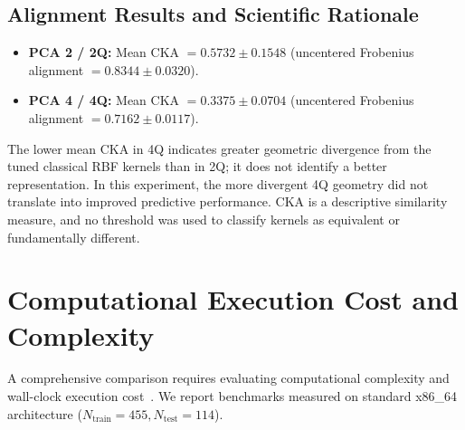 \documentclass[12pt,a4paper]{article}
\begin{document}
\begin{table}[htbp]
\centering
\caption{Kernel Geometry and Centered Kernel Alignment (CKA) across 5 Outer Splits (Mean $\pm$ SD).}
\label{tab:cka}
\vspace{2mm}
\end{table}

\subsection{Alignment Results and Scientific Rationale}
\begin{itemize}
    \item \textbf{PCA 2 / 2Q:} Mean CKA $= \mathbf{0.5732 \pm 0.1548}$ (uncentered Frobenius alignment $= 0.8344 \pm 0.0320$).
    \item \textbf{PCA 4 / 4Q:} Mean CKA $= \mathbf{0.3375 \pm 0.0704}$ (uncentered Frobenius alignment $= 0.7162 \pm 0.0117$).
\end{itemize}
The lower mean CKA in 4Q indicates greater geometric divergence from the tuned classical RBF kernels than in 2Q; it does not identify a better representation. In this experiment, the more divergent 4Q geometry did not translate into improved predictive performance. CKA is a descriptive similarity measure, and no threshold was used to classify kernels as equivalent or fundamentally different.

\section{Computational Execution Cost and Complexity}
A comprehensive comparison requires evaluating computational complexity and wall-clock execution cost~\cite{chang2011libsvm, preskill2018quantum}. We report benchmarks measured on standard x86\_64 architecture ($N_{\text{train}}=455, N_{\text{test}}=114$).
\end{document}
